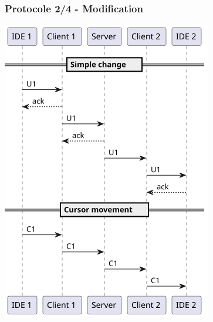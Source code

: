 \documentclass{beamer}
\begin{document}
\begin{frame}
    \frametitle{Protocole 2/4 - Modification}
    \includegraphics[width=\textwidth,height=0.8\textheight,keepaspectratio]{diagrams/2.png}
\end{frame}
\end{document}
